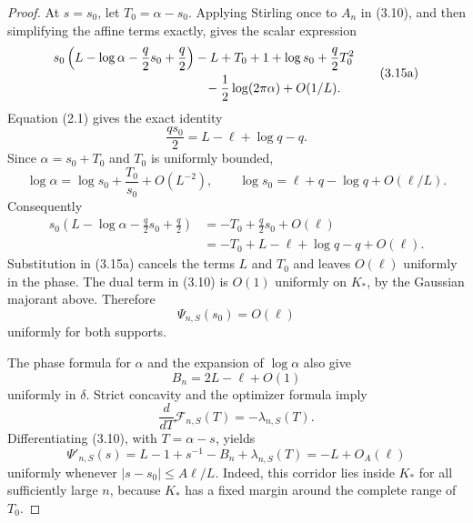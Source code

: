 \begin{proof}
At $s=s_0$, let $T_0=\alpha-s_0$. Applying Stirling once to $A_n$ in
(3.10), and then simplifying the affine terms exactly, gives the scalar
expression
\begin{equation*}
\begin{split}
  &s_0\left(
    L-\log\alpha-\frac q2s_0+\frac q2
  \right)-L+T_0+1+\log s_0+\frac q2T_0^2\\
  &\hspace{42mm}
  -\frac12\log(2\pi\alpha)+O(1/L).
\end{split}
  \tag{3.15a}
\end{equation*}
Equation (2.1) gives the exact identity
\[
  \frac{qs_0}{2}=L-\ell+\log q-q.
\]
Since $\alpha=s_0+T_0$ and $T_0$ is uniformly bounded,
\[
  \log\alpha
  =\log s_0+\frac{T_0}{s_0}+O(L^{-2}),
  \qquad
  \log s_0=\ell+q-\log q+O(\ell/L).
\]
Consequently
\[
\begin{split}
  s_0\left(
    L-\log\alpha-\frac q2s_0+\frac q2
  \right)
  &=-T_0+\frac q2s_0+O(\ell)\\
  &=-T_0+L-\ell+\log q-q+O(\ell).
\end{split}
\]
Substitution in (3.15a) cancels the terms $L$ and $T_0$ and leaves
$O(\ell)$ uniformly in the phase. The dual term in (3.10) is $O(1)$ uniformly
on $K_*$, by the Gaussian majorant above. Therefore
\begin{equation*}
  \Psi_{n,S}(s_0)=O(\ell)
  \tag{3.16}
\end{equation*}
uniformly for both supports.

The phase formula for $\alpha$ and the expansion of $\log\alpha$ also give
\begin{equation*}
  B_n=2L-\ell+O(1)
  \tag{3.17}
\end{equation*}
uniformly in $\delta$. Strict concavity and the optimizer formula imply
\[
  \frac{d}{dT}\mathcal F_{n,S}(T)=-\lambda_{n,S}(T).
\]
Differentiating (3.10), with $T=\alpha-s$, yields
\begin{equation*}
  \Psi'_{n,S}(s)
  =L-1+s^{-1}-B_n+\lambda_{n,S}(T)
  =-L+O_A(\ell)
  \tag{3.18}
\end{equation*}
uniformly whenever $|s-s_0|\le A\ell/L$. Indeed, this corridor lies inside
$K_*$ for all sufficiently large $n$, because $K_*$ has a fixed margin around
the complete range of $T_0$.


\end{proof}
